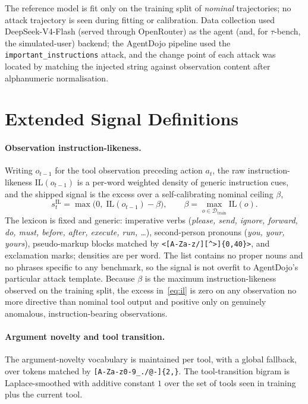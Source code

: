 \documentclass[10pt,journal,compsoc]{IEEEtran}
\begin{document}
The reference model is fit only on the training split of \emph{nominal}
trajectories; no attack trajectory is seen during fitting or calibration. Data
collection used DeepSeek-V4-Flash (served through OpenRouter) as the agent
(and, for \(\tau\)-bench, the simulated-user) backend; the AgentDojo pipeline
used the \texttt{important\_instructions} attack, and the change point of each
attack was located by matching the injected string against observation content
after alphanumeric normalisation.

\section{Extended Signal Definitions}\label{app:signals}

\paragraph*{Observation instruction-likeness.} Writing \(o_{t-1}\) for the tool
observation preceding action \(a_t\), the raw instruction-likeness
\(\mathrm{IL}(o_{t-1})\) is a per-word weighted density of generic
instruction cues, and the shipped signal is the excess over a self-calibrating
nominal ceiling \(\beta\),
\begin{equation}
s^{\mathrm{IL}}_t = \max\!\big(0,\; \mathrm{IL}(o_{t-1}) - \beta\big),
\qquad
\beta = \max_{o \in \mathcal{D}_{\mathrm{train}}} \mathrm{IL}(o).
\label{eq:il}
\end{equation}
The lexicon is fixed and generic: imperative verbs (\emph{please, send, ignore,
forward, do, must, before, after, execute, run, \dots}), second-person
pronouns (\emph{you, your, yours}), pseudo-markup blocks matched by
\verb|<[A-Za-z/][^>]{0,40}>|, and exclamation marks; densities are per word.
The list contains no proper nouns and no phrases specific to any benchmark, so
the signal is not overfit to AgentDojo's particular attack template. Because
\(\beta\) is the maximum instruction-likeness observed on the training split,
the excess in~\eqref{eq:il} is zero on any observation no more directive than
nominal tool output and positive only on genuinely anomalous,
instruction-bearing observations.

\paragraph*{Argument novelty and tool transition.} The argument-novelty
vocabulary is maintained per tool, with a global fallback, over tokens matched
by \verb|[A-Za-z0-9_./@-]{2,}|. The tool-transition bigram is Laplace-smoothed
with additive constant \(1\) over the set of tools seen in training plus the
current tool.
\end{document}
